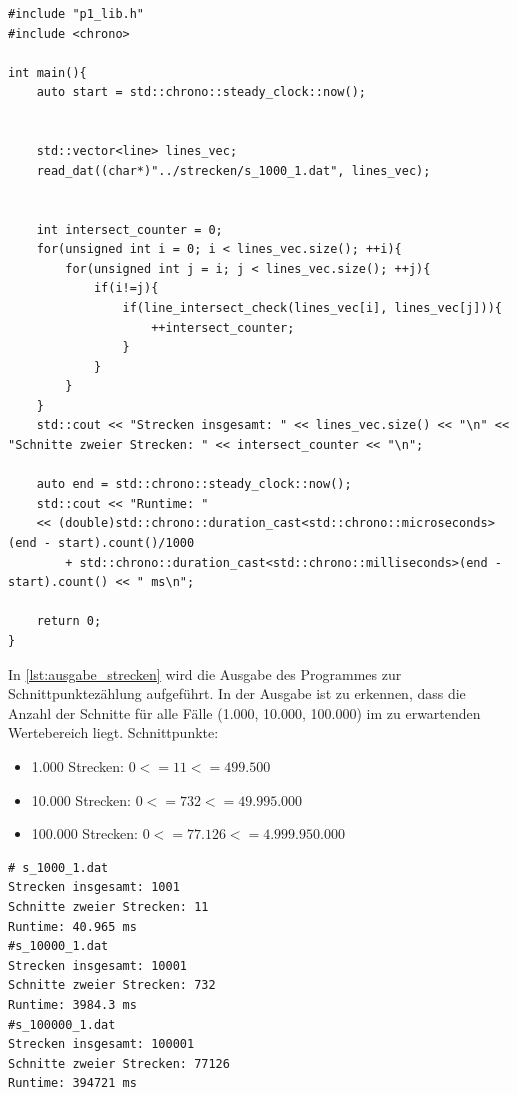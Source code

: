 \documentclass[12pt]{scrartcl}
\begin{document}
\begin{lstlisting}[style=CStyle, caption={strecken.cpp: Aufgruf der Bibliotheksfunktionen},captionpos=b]
#include "p1_lib.h"
#include <chrono>

int main(){
    auto start = std::chrono::steady_clock::now();


    std::vector<line> lines_vec;
    read_dat((char*)"../strecken/s_1000_1.dat", lines_vec);


    int intersect_counter = 0;
    for(unsigned int i = 0; i < lines_vec.size(); ++i){
        for(unsigned int j = i; j < lines_vec.size(); ++j){
            if(i!=j){
                if(line_intersect_check(lines_vec[i], lines_vec[j])){
                    ++intersect_counter;
                }
            }
        }
    }
    std::cout << "Strecken insgesamt: " << lines_vec.size() << "\n" << "Schnitte zweier Strecken: " << intersect_counter << "\n";

    auto end = std::chrono::steady_clock::now();     
    std::cout << "Runtime: " 
    << (double)std::chrono::duration_cast<std::chrono::microseconds>(end - start).count()/1000 
        + std::chrono::duration_cast<std::chrono::milliseconds>(end - start).count() << " ms\n";

    return 0;
}
\end{lstlisting}

In \autoref{lst:ausgabe_strecken} wird die Ausgabe des Programmes zur Schnittpunktezählung aufgeführt.
In der Ausgabe ist zu erkennen, dass die Anzahl der Schnitte für alle Fälle (1.000, 10.000, 100.000) im zu erwartenden Wertebereich liegt.
Schnittpunkte:
\begin{itemize}
    \item 1.000 Strecken: $0<= 11 <= 499.500$
    \item 10.000 Strecken: $0<= 732 <= 49.995.000$
    \item 100.000 Strecken: $0<= 77.126 <= 4.999.950.000$
\end{itemize}

\begin{lstlisting}[style=Terminal, caption={strecken.cpp: Ausgabe Konsole},captionpos=b, label={lst:ausgabe_strecken}]
# s_1000_1.dat
Strecken insgesamt: 1001
Schnitte zweier Strecken: 11
Runtime: 40.965 ms
#s_10000_1.dat
Strecken insgesamt: 10001
Schnitte zweier Strecken: 732
Runtime: 3984.3 ms
#s_100000_1.dat
Strecken insgesamt: 100001
Schnitte zweier Strecken: 77126
Runtime: 394721 ms
\end{lstlisting}
\end{document}
